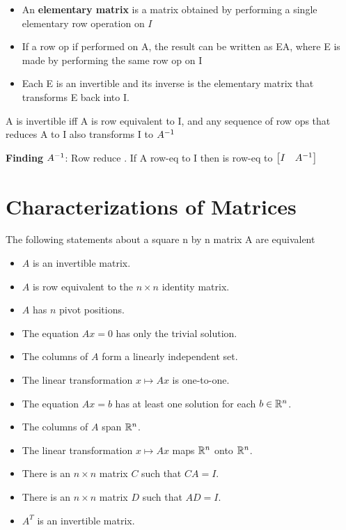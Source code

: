 \documentclass{report}
\begin{document}
\begin{itemize}
    \item An \textbf{elementary matrix} is a matrix obtained by performing a single 
elementary row operation on $I$
    \item If a row op if performed on A, the result can be written as EA, where E is made
    by performing the same row op on I
    \item Each E is an invertible and its inverse is the elementary matrix that transforms E back into I. 
\end{itemize}

\begin{theorem}
    A is invertible iff A is row equivalent to I, and any sequence of row ops that reduces A 
    to I also transforms I to $A^{-1}$
\end{theorem}

\textbf{Finding }$A^{-1}$: Row reduce \matAI. If A row-eq to I then \matAI is row-eq to
$\begin{bmatrix}I & A^{-1}\end{bmatrix}$

\setcounter{section}{2}
\section{Characterizations of Matrices}

\setcounter{theorem}{7}
\begin{theorem}\end{theorem}
\begin{tcolorbox}[colback=blue!5!white, colframe=blue!75!black]
The following statements about a square n by n matrix A are equivalent
\begin{itemize}
    \item \( A \) is an invertible matrix.
    \item \( A \) is row equivalent to the \( n \times n \) identity matrix.
    \item \( A \) has \( n \) pivot positions.
    \item The equation \( Ax = 0 \) has only the trivial solution.
    \item The columns of \( A \) form a linearly independent set.
    \item The linear transformation \( x \mapsto Ax \) is one-to-one.
    \item The equation \( Ax = b \) has at least one solution for each \( b \in \mathbb{R}^n \).
    \item The columns of \( A \) span \( \mathbb{R}^n \).
    \item The linear transformation \( x \mapsto Ax \) maps \( \mathbb{R}^n \) onto \( \mathbb{R}^n \).
    \item There is an \( n \times n \) matrix \( C \) such that \( CA = I \).
    \item There is an \( n \times n \) matrix \( D \) such that \( AD = I \).
    \item \( A^T \) is an invertible matrix.
\end{itemize}
\end{tcolorbox}
\end{document}
